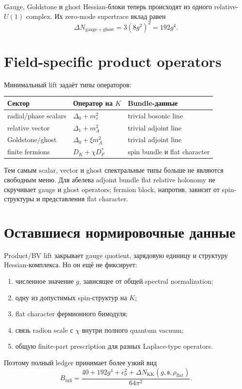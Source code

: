 \begin{proposition}
Gauge, Goldstone и ghost Hessian-блоки теперь происходят из одного
relative-\(U(1)\) complex. Их zero-mode supertrace вклад равен
\begin{equation}
 \Delta N_{\mathrm{gauge+ghost}}
 =3(8g^2)^2=192g^4.
\end{equation}
\end{proposition}

\section{Field-specific product operators}

Минимальный lift задаёт типы операторов:
\begin{center}
\begin{tabular}{lll}
\toprule
Сектор & Оператор на \(K\) & Bundle-данные \\
\midrule
radial/phase scalars & \(\Delta_0+m_s^2\) & trivial bosonic line \\
relative vector & \(\Delta_1+m_A^2\) & trivial adjoint line \\
Goldstone/ghost & \(\Delta_0+\xi m_A^2\) & trivial adjoint line \\
finite fermions & \(D_K+\chi D_F^*\) & spin bundle и flat character \\
\bottomrule
\end{tabular}
\end{center}
Тем самым scalar, vector и ghost спектральные типы больше не являются
свободным меню. Для абелева adjoint bundle flat relative holonomy не
скручивает gauge и ghost operators; fermion block, напротив, зависит от
spin-структуры и представления flat character.

\section{Оставшиеся нормировочные данные}

Product/BV lift закрывает gauge quotient, зарядовую единицу и структуру
Hessian-комплекса. Но он ещё не фиксирует:
\begin{enumerate}
 \item численное значение \(g\), зависящее от общей spectral
 normalization;
 \item одну из допустимых spin-структур на \(K\);
 \item flat character фермионного бимодуля;
 \item связь radion scale с \(\chi\) внутри полного quantum vacuum;
 \item общую finite-part prescription для разных Laplace-type operators.
\end{enumerate}
Поэтому полный ledger принимает более узкий вид
\begin{equation}
 B_{\mathrm{full}}
 =\frac{40+192g^4+c_\sigma^2+\Delta N_{\mathrm{KK}}
 (g,\mathfrak s,\rho_{\mathrm{flat}})}
 {64\pi^2}.
\end{equation}

